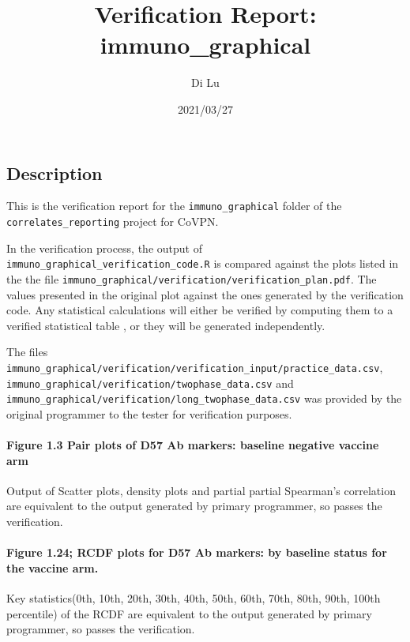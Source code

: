 \documentclass[]{article}
\title{Verification Report: immuno\_graphical}
\author{Di Lu}
\date{2021/03/27}
\let\oldparagraph\paragraph
\renewcommand{\paragraph}[1]{\oldparagraph{#1}\mbox{}}
\begin{document}
\maketitle

\subsection{Description}\label{description}

This is the verification report for the \texttt{immuno\_graphical}
folder of the \texttt{correlates\_reporting} project for CoVPN.

In the verification process, the output of
\texttt{immuno\_graphical\_verification\_code.R} is compared against the
plots listed in the the file
\texttt{immuno\_graphical/verification/verification\_plan.pdf}. The
values presented in the original plot against the ones generated by the
verification code. Any statistical calculations will either be verified
by computing them to a verified statistical table , or they will be
generated independently.

The files
\texttt{immuno\_graphical/verification/verification\_input/practice\_data.csv},
\texttt{immuno\_graphical/verification/twophase\_data.csv} and
\texttt{immuno\_graphical/verification/long\_twophase\_data.csv} was
provided by the original programmer to the tester for verification
purposes.

\paragraph{Figure 1.3 Pair plots of D57 Ab markers: baseline negative
vaccine
arm}\label{figure-1.3-pair-plots-of-d57-ab-markers-baseline-negative-vaccine-arm}

Output of Scatter plots, density plots and partial partial Spearman's
correlation are equivalent to the output generated by primary
programmer, so passes the verification.

\paragraph{Figure 1.24; RCDF plots for D57 Ab markers: by baseline
status for the vaccine
arm.}\label{figure-1.24-rcdf-plots-for-d57-ab-markers-by-baseline-status-for-the-vaccine-arm.}

Key statistics(0th, 10th, 20th, 30th, 40th, 50th, 60th, 70th, 80th,
90th, 100th percentile) of the RCDF are equivalent to the output
generated by primary programmer, so passes the verification.
\end{document}
